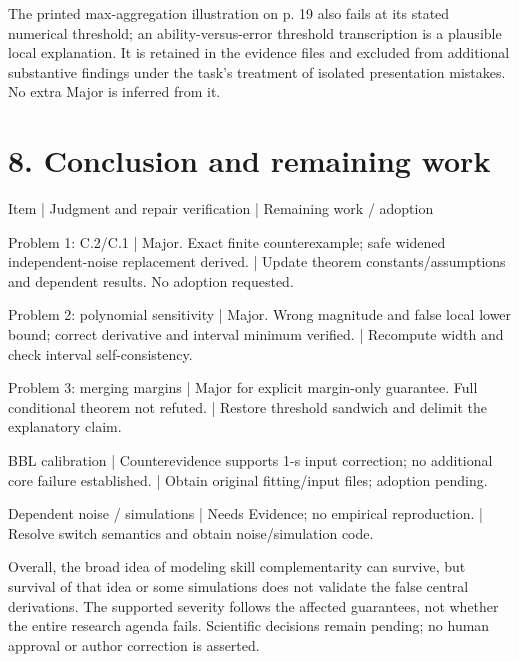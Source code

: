 \documentclass[10pt]{article}
\begin{document}
The printed max-aggregation illustration on p. 19 also fails at its stated numerical threshold; an ability-versus-error threshold transcription is a plausible local explanation. It is retained in the evidence files and excluded from additional substantive findings under the task’s treatment of isolated presentation mistakes. No extra Major is inferred from it.\par
\section*{8. Conclusion and remaining work}
Item | Judgment and repair verification | Remaining work / adoption\par
Problem 1: C.2/C.1 | Major. Exact finite counterexample; safe widened independent-noise replacement derived. | Update theorem constants/assumptions and dependent results. No adoption requested.\par
Problem 2: polynomial sensitivity | Major. Wrong magnitude and false local lower bound; correct derivative and interval minimum verified. | Recompute width and check interval self-consistency.\par
Problem 3: merging margins | Major for explicit margin-only guarantee. Full conditional theorem not refuted. | Restore threshold sandwich and delimit the explanatory claim.\par
BBL calibration | Counterevidence supports 1-s input correction; no additional core failure established. | Obtain original fitting/input files; adoption pending.\par
Dependent noise / simulations | Needs Evidence; no empirical reproduction. | Resolve switch semantics and obtain noise/simulation code.\par
Overall, the broad idea of modeling skill complementarity can survive, but survival of that idea or some simulations does not validate the false central derivations. The supported severity follows the affected guarantees, not whether the entire research agenda fails. Scientific decisions remain pending; no human approval or author correction is asserted.\par
\end{document}
